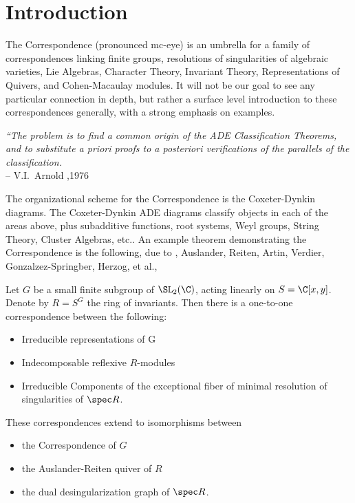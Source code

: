 \newpage
\section{Introduction}

The \mc Correspondence (pronounced mc-eye) is an umbrella for a family of correspondences linking finite groups, resolutions of singularities of algebraic varieties, Lie Algebras, Character Theory, Invariant Theory, Representations of Quivers, and Cohen-Macaulay modules. It will not be our goal to see any particular connection in depth, but rather a surface level introduction to these correspondences generally, with a strong emphasis on examples. \\

        \begin{nscenter}
        \begin{minipage}{0.8\textwidth}
        {\itshape ``The problem is to find a common origin of the ADE Classification Theorems, and to substitute a priori proofs to a posteriori verifications of the parallels of the classification.} \\
        \phantom{x}\hspace{1cm} -- V.I.~Arnold ,1976 \\
        \end{minipage}
        \end{nscenter}

The organizational scheme for the \mc Correspondence is the Coxeter-Dynkin diagrams. The Coxeter-Dynkin ADE diagrams classify objects in each of the areas above, plus subadditive functions, root systems, Weyl groups, String Theory, Cluster Algebras, etc.. An example theorem demonstrating the \mc Correspondence is the following, due to \mc, Auslander, Reiten, Artin, Verdier, Gonzalzez-Springber, Herzog, et al.,


\begin{thm}
Let $G$ be a small finite subgroup of $\SL_2(\C)$, acting linearly on $S= \C[x,y]$. Denote by $R=S^G$ the ring of invariants. Then there is a one-to-one correspondence between the following:
	\begin{itemize}
	\item Irreducible representations of G
	\item Indecomposable reflexive $R$-modules
	\item Irreducible Components of the exceptional fiber of minimal resolution of singularities of $\spec R$.
	\end{itemize}
These correspondences extend to isomorphisms between 
	\begin{itemize}
	\item the \mc Correspondence of $G$
	\item the Auslander-Reiten quiver of $R$
	\item the dual desingularization graph of $\spec R$. 
	\end{itemize}
\end{thm}



